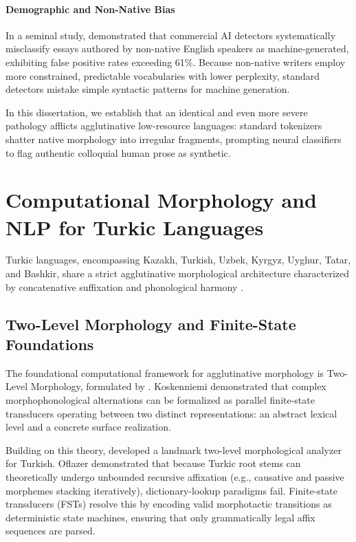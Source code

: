 \paragraph{Demographic and Non-Native Bias}
In a seminal study, \citet{liang2023gptdetectors} demonstrated that commercial AI detectors systematically misclassify essays authored by non-native English speakers as machine-generated, exhibiting false positive rates exceeding 61\%. Because non-native writers employ more constrained, predictable vocabularies with lower perplexity, standard detectors mistake simple syntactic patterns for machine generation. 

In this dissertation, we establish that an identical and even more severe pathology afflicts agglutinative low-resource languages: standard tokenizers shatter native morphology into irregular fragments, prompting neural classifiers to flag authentic colloquial human prose as synthetic.

\section{Computational Morphology and NLP for Turkic Languages}
\label{sec:rel_turkic_morphology}

Turkic languages, encompassing Kazakh, Turkish, Uzbek, Kyrgyz, Uyghur, Tatar, and Bashkir, share a strict agglutinative morphological architecture characterized by concatenative suffixation and phonological harmony \citep{oflazer1994twolevel,tyers2016finite,bekmanova2021kazakh}.

\subsection{Two-Level Morphology and Finite-State Foundations}
The foundational computational framework for agglutinative morphology is Two-Level Morphology, formulated by \citet{koskenniemi1983twolevel}. Koskenniemi demonstrated that complex morphophonological alternations can be formalized as parallel finite-state transducers operating between two distinct representations: an abstract lexical level and a concrete surface realization.

Building on this theory, \citet{oflazer1994twolevel} developed a landmark two-level morphological analyzer for Turkish. Oflazer demonstrated that because Turkic root stems can theoretically undergo unbounded recursive affixation (e.g., causative and passive morphemes stacking iteratively), dictionary-lookup paradigms fail. Finite-state transducers (FSTs) resolve this by encoding valid morphotactic transitions as deterministic state machines, ensuring that only grammatically legal affix sequences are parsed.

